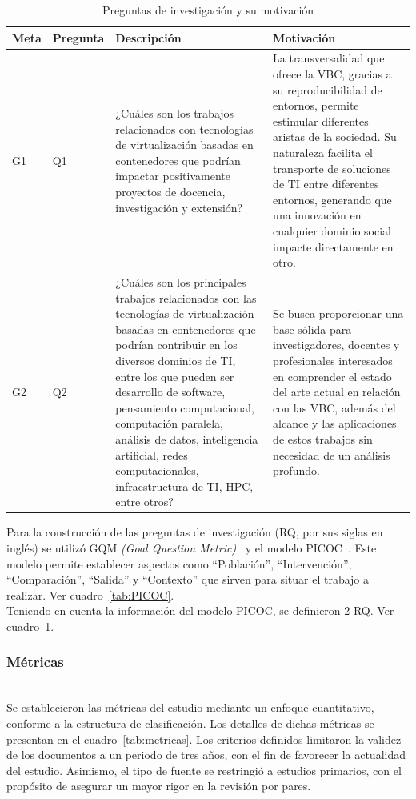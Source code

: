 \begin{table}[!t]
\centering

\renewcommand{\arraystretch}{1.4}
\begin{tabularx}{\textwidth}{>{\centering\arraybackslash}m{} >{\centering\arraybackslash}m{} >{\RaggedRight\arraybackslash}X >{\RaggedRight\arraybackslash}X}
\toprule
\textbf{Meta} & \textbf{Pregunta} & \textbf{Descripción} & \textbf{Motivación} \\
\midrule
G1 & Q1 & ¿Cuáles son los trabajos relacionados con tecnologías de virtualización basadas en contenedores que podrían impactar positivamente proyectos de docencia, investigación y extensión? & La transversalidad que ofrece la VBC, gracias a su reproducibilidad de entornos, permite estimular diferentes aristas de la sociedad. Su naturaleza facilita el transporte de soluciones de TI entre diferentes entornos, generando que una innovación en cualquier dominio social impacte directamente en otro. \\
\midrule
G2 & Q2 & ¿Cuáles son los principales trabajos relacionados con las tecnologías de virtualización basadas en contenedores que podrían contribuir en los diversos dominios de TI, entre los que pueden ser desarrollo de software, pensamiento computacional, computación paralela, análisis de datos, inteligencia artificial, redes computacionales, infraestructura de TI, HPC, entre otros? & Se busca proporcionar una base sólida para investigadores, docentes y profesionales interesados en comprender el estado del arte actual en relación con las VBC, además del alcance y las aplicaciones de estos trabajos sin necesidad de un análisis profundo. \\
\bottomrule
\end{tabularx}
\caption{Preguntas de investigación y su motivación}\label{tab:preguntas}
\end{table}
Para la construcción de las preguntas de investigación (RQ, por sus siglas en inglés) se utilizó GQM \textit{(Goal Question Metric)}~\cite{Needleman2002} y el modelo PICOC~\cite{petticrew2008systematic}.
Este modelo permite establecer aspectos como ``Población'', ``Intervención'', ``Comparación'', ``Salida'' y ``Contexto'' que sirven para situar el trabajo a realizar. Ver cuadro~\ref{tab:PICOC}. \\

Teniendo en cuenta la información del modelo PICOC, se definieron 2 RQ. Ver cuadro~\ref{tab:preguntas}.\\
\subsubsection{Métricas}
\mbox{}\\
Se establecieron las métricas del estudio mediante un enfoque cuantitativo, conforme a la estructura de clasificación. Los detalles de dichas métricas se presentan en el cuadro~\ref{tab:metricas}.
Los criterios definidos limitaron la validez de los documentos a un periodo de tres años, con el fin de favorecer la actualidad del estudio.
Asimismo, el tipo de fuente se restringió a estudios primarios, con el propósito de asegurar un mayor rigor en la revisión por pares.

